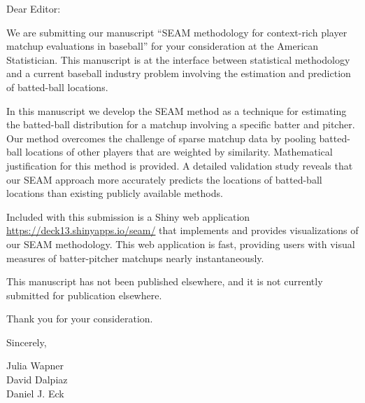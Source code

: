 \documentclass[11pt]{article}
\begin{document}
\footnotesize

\normalsize 


Dear Editor: 

We are submitting our manuscript ``SEAM methodology for context-rich player matchup evaluations in baseball'' for your consideration at the American Statistician. This manuscript is at the interface between statistical methodology and a current baseball industry problem involving the estimation and prediction of batted-ball locations. 

In this manuscript we develop the SEAM method as a technique for estimating the batted-ball distribution for a matchup involving a specific batter and pitcher. Our method overcomes the challenge of sparse matchup data by pooling batted-ball locations of other players that are weighted by similarity. Mathematical justification for this method is provided. A detailed validation study reveals that our SEAM approach more accurately predicts the locations of batted-ball locations than existing publicly available methods.

Included with this submission is a Shiny web application \url{https://deck13.shinyapps.io/seam/} that implements and provides visualizations of our SEAM methodology. This web application is fast, providing users with visual measures of batter-pitcher matchups nearly instantaneously.

This manuscript has not been published elsewhere, and it is not currently submitted for publication elsewhere.

Thank you for your consideration.

Sincerely,

Julia Wapner \\
David Dalpiaz \\
Daniel J. Eck
\end{document}
